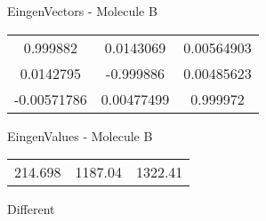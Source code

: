 \begin{multicols}{2}
\begin{center}
\vtab
 EingenVectors - Molecule B     \\
\vtab
\begin{tabular}{|c c c|}
0.999882	 & 	0.0143069	 & 	0.00564903	 \\
0.0142795	 & 	-0.999886	 & 	0.00485623	 \\
-0.00571786	 & 	0.00477499	 & 	0.999972
\end{tabular}

\vtab
 EingenValues - Molecule B     \\
\vtab
\begin{tabular}{|c c c|}
214.698	 & 	1187.04	 & 	1322.41	 \\
\end{tabular}

\end{center}
\end{multicols}
\begin{center}
\vtab
\vtab
\textcolor{NavyBlue}{\Large Different}
\end{center}

 \newpage

